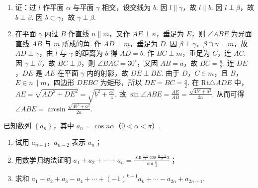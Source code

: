 \documentclass[UTF8,a4paper,oneside,11pt]{ctexbook}
\begin{document}
\begin{solution}
\begin{enumerate}
\item 证：过 \(l\) 作平面 \(\alpha\) 与平面 \(\gamma\) 相交，设交线为 \(b\). 因 \(l \parallel \gamma\)，故 \(l \parallel b\). 因 \(l \perp \beta\)，故 \(b \perp \beta\). 因 \(b \subset \gamma\)，故 \(\gamma \perp \beta\).
\item 在平面 \(\gamma\) 内过 \(B\) 作直线 \(n \parallel m\)，又作 \(AE \perp n\)，垂足为 \(E\)，则 \(\angle ABE\) 为异面直线 \(AB\) 与 \(m\) 所成的角. 作 \(AD \perp m\)，垂足为 \(D\). 因 \(\beta \perp \gamma\)，\(\beta \cap \gamma = m\)，故 \(AD \perp \gamma\)，由 \(l\) 与 \(\gamma\) 的距离为 \(b\) 得 \(AD = b\). 作 \(BC \perp m\)，垂足为 \(C\)，连 \(AC\). 因 \(\gamma \perp \beta\)，故 \(BC \perp \beta\)，则 \(\angle BAC = 30^{\circ}\)，又因 \(AB = a\)，故 \(BC = \frac{a}{2}\). 连 \(DE\)，\(DE\) 是 \(AE\) 在平面 \(\gamma\) 内的射影，故 \(DE \perp BE\). 由于 \(D\)，\(C\in m\)，且 \(B\)，\(E\in n\parallel m\)，四边形 \(DEBC\) 为矩形，所以 \(DE=BC=\frac{a}{2}\). 在 \(\mathrm{Rt}\triangle ADE\) 中，\(AE=\sqrt{AD^{2}+DE^{2}}=\sqrt{b^{2}+\frac{a^{2}}{4}}\). 故 \(\sin\angle ABE=\frac{AE}{AB}=\frac{\sqrt{4b^{2}+a^{2}}}{2a}\). 从而可得 \(\angle ABE = \arcsin \frac{\sqrt{4b^{2} + a^{2}}}{2a}\).
\end{enumerate}
\end{solution}

\begin{problem}

已知数列 \(\left\{a_{n}\right\}\)，其中 \(a_{n}=\cos n\alpha\)（\(0<\alpha<\pi\)）.

\begin{enumerate}
\item 试用 \(a_{n-1}\)，\(a_{n-2}\) 表示 \(a_{n}\)；
\item 用数学归纳法证明 \(a_{1}+a_{2}+\cdots+a_{n}=\frac{\sin\frac{n\alpha}{2}\cos\frac{n+1}{2}\alpha}{\sin\frac{\alpha}{2}}\)；
\item 求和 \(a_{1}-a_{2}+a_{3}-a_{4}+\cdots+(-1)^{k+1}a_{k}+\cdots-a_{2n}+a_{2n+1}\).
\end{enumerate}
\end{problem}
\end{document}
